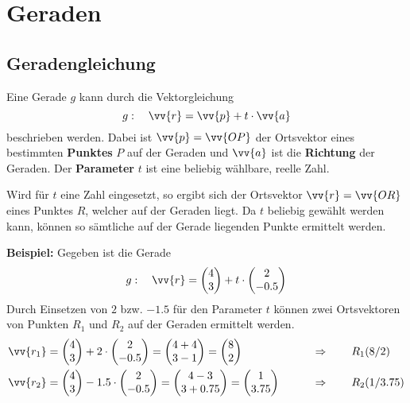\newpage
\section{Geraden}

\subsection{Geradengleichung}
Eine Gerade $g$ kann durch die Vektorgleichung
\[
  g:\quad \vv{r} = \vv{p} + t\cdot\vv{a}
\]
beschrieben werden. Dabei ist $\vv{p} = \vv{OP}$ der Ortsvektor eines bestimmten
\textbf{Punktes} $P$ auf der Geraden und $\vv{a}$ ist die \textbf{Richtung} der
Geraden. Der \textbf{Parameter} $t$ ist eine beliebig wählbare, reelle Zahl.

Wird für $t$ eine Zahl eingesetzt, so ergibt sich der Ortsvektor
$\vv{r} = \vv{OR}$ eines Punktes $R$, welcher auf der Geraden liegt. Da $t$
beliebig gewählt werden kann, können so sämtliche auf der Gerade liegenden
Punkte ermittelt werden.
\begin{center}
\end{center}
\begin{example}
  \textbf{Beispiel:} Gegeben ist die Gerade
  \[
    g:\quad \vv{r} = \vxy{4,3}+t\cdot\vxy{2,-0.5}
  \]
  Durch Einsetzen von $2$ bzw. $-1.5$ für den Parameter $t$ können zwei
  Ortsvektoren von Punkten $R_{1}$ und $R_{2}$ auf der Geraden ermittelt werden.
  \begin{align*}
    \vv{r_{1}} &= \vxy{4,3}+2\cdot\vxy{2,-0.5} = \vxy{4+4,3-1} = \vxy{8,2} \qquad&&\Rightarrow\qquad \pxy[R_{1}]{8,2} \\
    \vv{r_{2}} &= \vxy{4,3}-1.5\cdot\vxy{2,-0.5} = \vxy{4-3,3+0.75} = \vxy{1,3.75} \qquad&&\Rightarrow\qquad \pxy[R_{2}]{1,3.75}
  \end{align*}
\end{example}

